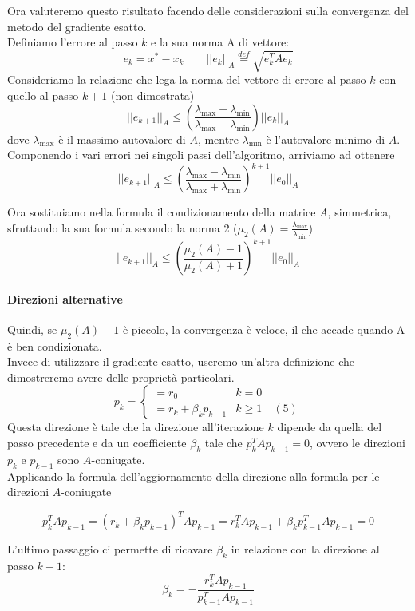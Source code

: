 Ora valuteremo questo risultato facendo delle considerazioni sulla
convergenza del metodo del gradiente esatto.  \\ 
Definiamo l'errore al passo $k$ e la sua norma A di vettore:
$$ e_{k} = x^{*} - x_{k} \qquad ||e_{k} ||_{A} \stackrel{def}{=} \sqrt{e_{k}^{T} A e_{k}}$$
Consideriamo la relazione che lega la norma del vettore di errore al
passo $k$ con quello al passo $k+1$ (non dimostrata)
$$ || e_{k+1} ||_{A} \leq 
\left( \frac{\lambda_{\max} - \lambda_{\min}}{\lambda_{\max}+
\lambda_{\min}}\right) ||{e_{k}}||_{A}$$ dove $\lambda_{\max}$ \`e il
massimo autovalore di $A$, mentre $\lambda_{\min}$ \`e l'autovalore
minimo di $A$.  Componendo i vari errori nei singoli passi
dell'algoritmo, arriviamo ad ottenere
$$ || e_{k+1} ||_{A} \leq 
\left( \frac{\lambda_{\max} - \lambda_{\min}}{\lambda_{\max}+
\lambda_{\min}}\right)^{k+1} ||{e_{0}}||_{A}$$

Ora sostituiamo nella formula il condizionamento della matrice $A$, simmetrica,
sfruttando la sua formula secondo la norma 2 ($ \mu_{2}(A) =
\frac{\lambda_{\max}}{\lambda_{\min}}$)
$$ || e_{k+1} ||_{A} \leq 
\left( \frac{\mu_{2}(A) -1 }{\mu_{2}(A) +1}\right)^{k+1}
||{e_{0}}||_{A}$$

\paragraph{Direzioni alternative}
Quindi, se $\mu_{2}(A) -1$ \`e piccolo, la convergenza \`e veloce, il che
accade quando A \`e ben condizionata.  \\ Invece di utilizzare il
gradiente esatto, useremo un'altra definizione che dimostreremo avere
delle proprietà particolari.
$$
p_{k} = \left\{
\begin{array}{ll} = r_0 & k=0 \\ = r_{k} + \beta_{k}p_{k-1} & k \geq 1
\quad (5)
\end{array} \right.
$$
Questa direzione \`e tale che la direzione all'iterazione $k$ dipende da
quella del passo precedente e da un coefficiente $\beta_{k}$ tale che
$p_{k}^{T} A p_{k-1} = 0$, ovvero le direzioni $p_{k}$ e $p_{k-1}$
sono $A$-coniugate.  \\ Applicando la formula dell'aggiornamento della
direzione alla formula per le direzioni $A$-coniugate

$$ p_{k}^{T}Ap_{k-1}= (r_{k}+ \beta_{k} p_{k-1})^{T} A  p_{k-1} = 
  r_{k}^{T} A p_{k-1} + \beta_{k} p_{k-1}^{T} A p_{k-1}=0$$

L'ultimo passaggio ci permette di ricavare $\beta_{k}$ in relazione
con la direzione al passo $k-1$:
$$
\beta_{k}= -\frac{r_{k}^{T}Ap_{k-1}}{p_{k-1}^{T}Ap_{k-1}}
$$

